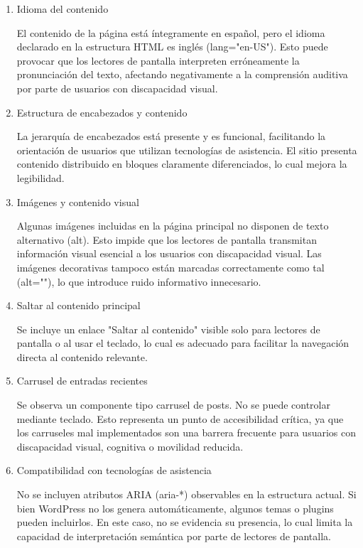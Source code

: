 \documentclass[a4paper]{article}
\begin{document}
\begin{enumerate}
    \item Idioma del contenido

    El contenido de la página está íntegramente en español, pero el idioma declarado en la estructura HTML es inglés (lang="en-US"). Esto puede provocar que los lectores de pantalla interpreten erróneamente la pronunciación del texto, afectando negativamente a la comprensión auditiva por parte de usuarios con discapacidad visual.

    \item Estructura de encabezados y contenido

    La jerarquía de encabezados está presente y es funcional, facilitando la orientación de usuarios que utilizan tecnologías de asistencia. El sitio presenta contenido distribuido en bloques claramente diferenciados, lo cual mejora la legibilidad.

    \item Imágenes y contenido visual

    Algunas imágenes incluidas en la página principal no disponen de texto alternativo (alt). Esto impide que los lectores de pantalla transmitan información visual esencial a los usuarios con discapacidad visual. Las imágenes decorativas tampoco están marcadas correctamente como tal (alt=""), lo que introduce ruido informativo innecesario.

    \item Saltar al contenido principal

    Se incluye un enlace "Saltar al contenido" visible solo para lectores de pantalla o al usar el teclado, lo cual es adecuado para facilitar la navegación directa al contenido relevante.

    \item Carrusel de entradas recientes

    Se observa un componente tipo carrusel de posts. No se puede controlar mediante teclado. Esto representa un punto de accesibilidad crítica, ya que los carruseles mal implementados son una barrera frecuente para usuarios con discapacidad visual, cognitiva o movilidad reducida.

    \item Compatibilidad con tecnologías de asistencia

    No se incluyen atributos ARIA (aria-*) observables en la estructura actual. Si bien WordPress no los genera automáticamente, algunos temas o plugins pueden incluirlos. En este caso, no se evidencia su presencia, lo cual limita la capacidad de interpretación semántica por parte de lectores de pantalla.

\end{enumerate}
\end{document}
